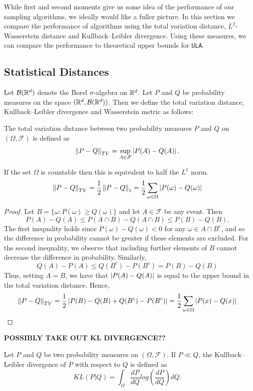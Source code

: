 While first and second moments give us some idea of the performance of our sampling algorithms, we ideally would like a fuller picture.  In this section we compare the performance of algorithms using the total variation distance, $L^2$-Wasserstein distance and Kullback--Leibler divergence.  Using these measures, we can compare the performance to theoretical upper bounds for \texttt{ULA}.

\subsection{Statistical Distances}
Let $\mathcal{B}(\mathbb{R}^d)$ denote the Borel $\sigma$-algebra on $\mathbb{R}^d$. Let $P$ and $Q$ be probability measures on the space $(\mathbb{R}^d, \mathcal{B}(\mathbb{R}^d))$.  Then we define the total variation distance, Kullback--Leibler divergence and Wasserstein metric as follows:

\begin{defn}
The total variation distance between two probability measures $P$ and $Q$ on $(\Omega, \mathcal{F})$ is defined as
$$
\norm{P - Q}_{TV} = \sup_{A \in \mathcal{F}} \abs{P(A) - Q(A)}.
$$
\end{defn}
\begin{prop}
If the set $\Omega$ is countable then this is equivalent to half the $L^1$ norm.
$$
\norm{P - Q}_{TV} = \frac{1}{2} \norm{P-Q}_1 = \frac{1}{2} \sum_{\omega \in \Omega} \abs{P(\omega) - Q(\omega)}
$$
\end{prop}
\begin{proof}
Let $B = \{\omega: P(\omega) \geq Q(\omega)\}$ and let $A \in \mathcal{F}$ be any event.  Then
$$
P(A) - Q(A) \leq P(A \cap B) - Q(A \cap B) \leq P(B) - Q(B).
$$
The first inequality holds since $P(\omega)-Q(\omega) < 0$ for any $\omega \in A \cap B^c$, and so the difference in probability cannot be greater if these elements are excluded.  For the second inequality, we observe that including further elements of $B$ cannot decrease the difference in probability.
Similarly,
$$
Q(A) - P(A) \leq Q(B^c) - P(B^c) = P(B) - Q(B)
$$
Thus, setting $A=B$, we have that $\abs{P(A)-Q(A)}$ is equal to the upper bound in the total variation distance.  Hence,
$$
\norm{P-Q}_{TV} = \frac{1}{2} \abs{P(B)-Q(B)+Q(B^c)-P(B^c)} = \frac{1}{2} \sum_{\omega \in \Omega} \abs{P(x)-Q(x)}
$$
\end{proof}


\textbf{POSSIBLY TAKE OUT KL DIVERGENCE??}

\begin{defn}
Let $P$ and $Q$ be two probability measures on $(\Omega, \mathcal{F})$.  If $P \ll Q$, the Kullback--Leibler divergence of $P$ with respect to $Q$ is defined as
$$
KL(P|Q) = \int_\Omega \frac{d P}{d Q} log \left(  \frac{d P}{d Q} \right) d Q.
$$
\end{defn}


